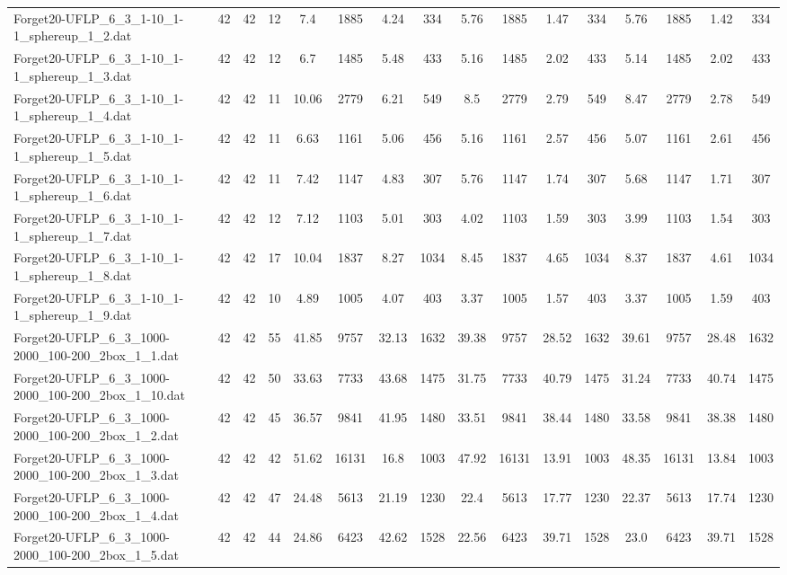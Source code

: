 \begin{sidewaystable}[!ht]
{\begin{tabular}{lccccccccccccccc}
Forget20-UFLP\_6\_3\_1-10\_1-1\_sphereup\_1\_2.dat & 42 & 42 & 12 & 7.4 & 1885 & 4.24 & 334 & 5.76 & 1885 & 1.47 & 334 & 5.76 & 1885 & 1.42 & 334 \\
Forget20-UFLP\_6\_3\_1-10\_1-1\_sphereup\_1\_3.dat & 42 & 42 & 12 & 6.7 & 1485 & 5.48 & 433 & 5.16 & 1485 & 2.02 & 433 & 5.14 & 1485 & 2.02 & 433 \\
Forget20-UFLP\_6\_3\_1-10\_1-1\_sphereup\_1\_4.dat & 42 & 42 & 11 & 10.06 & 2779 & 6.21 & 549 & 8.5 & 2779 & 2.79 & 549 & 8.47 & 2779 & 2.78 & 549 \\
Forget20-UFLP\_6\_3\_1-10\_1-1\_sphereup\_1\_5.dat & 42 & 42 & 11 & 6.63 & 1161 & 5.06 & 456 & 5.16 & 1161 & 2.57 & 456 & 5.07 & 1161 & 2.61 & 456 \\
Forget20-UFLP\_6\_3\_1-10\_1-1\_sphereup\_1\_6.dat & 42 & 42 & 11 & 7.42 & 1147 & 4.83 & 307 & 5.76 & 1147 & 1.74 & 307 & 5.68 & 1147 & 1.71 & 307 \\
Forget20-UFLP\_6\_3\_1-10\_1-1\_sphereup\_1\_7.dat & 42 & 42 & 12 & 7.12 & 1103 & 5.01 & 303 & 4.02 & 1103 & 1.59 & 303 & 3.99 & 1103 & 1.54 & 303 \\
Forget20-UFLP\_6\_3\_1-10\_1-1\_sphereup\_1\_8.dat & 42 & 42 & 17 & 10.04 & 1837 & 8.27 & 1034 & 8.45 & 1837 & 4.65 & 1034 & 8.37 & 1837 &  \textcolor{blue2}{4.61} & 1034 \\
Forget20-UFLP\_6\_3\_1-10\_1-1\_sphereup\_1\_9.dat & 42 & 42 & 10 & 4.89 & 1005 & 4.07 & 403 & 3.37 & 1005 & 1.57 & 403 & 3.37 & 1005 & 1.59 & 403 \\
Forget20-UFLP\_6\_3\_1000-2000\_100-200\_2box\_1\_1.dat & 42 & 42 & 55 & 41.85 & 9757 & 32.13 & 1632 & 39.38 & 9757 & 28.52 & 1632 & 39.61 & 9757 & 28.48 & 1632 \\
Forget20-UFLP\_6\_3\_1000-2000\_100-200\_2box\_1\_10.dat & 42 & 42 & 50 & 33.63 & 7733 & 43.68 & 1475 & 31.75 & 7733 & 40.79 & 1475 & 31.24 & 7733 & 40.74 & 1475 \\
Forget20-UFLP\_6\_3\_1000-2000\_100-200\_2box\_1\_2.dat & 42 & 42 & 45 & 36.57 & 9841 & 41.95 & 1480 & 33.51 & 9841 & 38.44 & 1480 & 33.58 & 9841 & 38.38 & 1480 \\
Forget20-UFLP\_6\_3\_1000-2000\_100-200\_2box\_1\_3.dat & 42 & 42 & 42 & 51.62 & 16131 & 16.8 & 1003 & 47.92 & 16131 & 13.91 & 1003 & 48.35 & 16131 &  \textcolor{blue2}{13.84} & 1003 \\
Forget20-UFLP\_6\_3\_1000-2000\_100-200\_2box\_1\_4.dat & 42 & 42 & 47 & 24.48 & 5613 & 21.19 & 1230 & 22.4 & 5613 & 17.77 & 1230 & 22.37 & 5613 & 17.74 & 1230 \\
Forget20-UFLP\_6\_3\_1000-2000\_100-200\_2box\_1\_5.dat & 42 & 42 & 44 & 24.86 & 6423 & 42.62 & 1528 &  \textcolor{blue2}{22.56} & 6423 & 39.71 & 1528 & 23.0 & 6423 & 39.71 & 1528 \\

\end{tabular}}
\end{sidewaystable}
